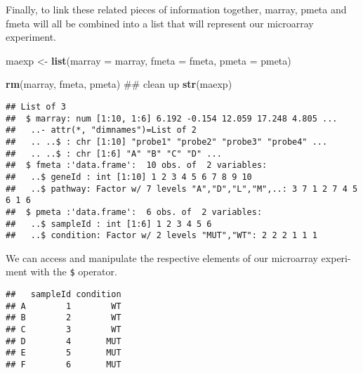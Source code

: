 \documentclass[]{article}
\newenvironment{Shaded}{\begin{snugshade}}{\end{snugshade}}
\newcommand{\CommentTok}[1]{\textcolor[rgb]{0.56,0.35,0.01}{\textit{#1}}}
\newcommand{\DataTypeTok}[1]{\textcolor[rgb]{0.13,0.29,0.53}{#1}}
\newcommand{\KeywordTok}[1]{\textcolor[rgb]{0.13,0.29,0.53}{\textbf{#1}}}
\newcommand{\NormalTok}[1]{#1}
\newcommand{\OperatorTok}[1]{\textcolor[rgb]{0.81,0.36,0.00}{\textbf{#1}}}
\newcommand{\StringTok}[1]{\textcolor[rgb]{0.31,0.60,0.02}{#1}}
\begin{document}
Finally, to link these related pieces of information together, marray,
pmeta and fmeta will all be combined into a list that will represent our
microarray experiment.

\begin{Shaded}
\begin{Highlighting}[]
\NormalTok{maexp <-}\StringTok{ }\KeywordTok{list}\NormalTok{(}\DataTypeTok{marray =}\NormalTok{ marray, }
              \DataTypeTok{fmeta =}\NormalTok{ fmeta, }
              \DataTypeTok{pmeta =}\NormalTok{ pmeta)}


\KeywordTok{rm}\NormalTok{(marray, fmeta, pmeta) ## clean up}
\KeywordTok{str}\NormalTok{(maexp)}
\end{Highlighting}
\end{Shaded}

\begin{verbatim}
## List of 3
##  $ marray: num [1:10, 1:6] 6.192 -0.154 12.059 17.248 4.805 ...
##   ..- attr(*, "dimnames")=List of 2
##   .. ..$ : chr [1:10] "probe1" "probe2" "probe3" "probe4" ...
##   .. ..$ : chr [1:6] "A" "B" "C" "D" ...
##  $ fmeta :'data.frame':  10 obs. of  2 variables:
##   ..$ geneId : int [1:10] 1 2 3 4 5 6 7 8 9 10
##   ..$ pathway: Factor w/ 7 levels "A","D","L","M",..: 3 7 1 2 7 4 5 6 1 6
##  $ pmeta :'data.frame':  6 obs. of  2 variables:
##   ..$ sampleId : int [1:6] 1 2 3 4 5 6
##   ..$ condition: Factor w/ 2 levels "MUT","WT": 2 2 2 1 1 1
\end{verbatim}

We can access and manipulate the respective elements of our microarray
experi- ment with the \texttt{\$} operator.

\begin{Shaded}
\end{Shaded}

\begin{verbatim}
##   sampleId condition
## A        1        WT
## B        2        WT
## C        3        WT
## D        4       MUT
## E        5       MUT
## F        6       MUT
\end{verbatim}

\begin{Shaded}
\end{Shaded}
\end{document}
